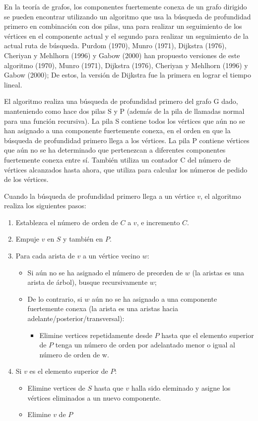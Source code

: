 En la teoría de grafos, los componentes fuertemente conexa de un grafo dirigido se pueden encontrar utilizando un algoritmo que usa la búsqueda de profundidad primero en combinación con dos pilas, una para realizar un seguimiento de los vértices en el componente actual y el segundo para realizar un seguimiento de la actual ruta de búsqueda. Purdom (1970), Munro (1971), Dijkstra (1976), Cheriyan y Mehlhorn (1996) y Gabow (2000) han propuesto versiones de este algoritmo (1970), Munro (1971), Dijkstra (1976), Cheriyan y Mehlhorn (1996) y Gabow (2000); De estos, la versión de Dijkstra fue la primera en lograr el tiempo lineal.

El algoritmo realiza una búsqueda de profundidad primero del grafo G dado, manteniendo como hace dos pilas S y P (además de la pila de llamadas normal para una función recursiva). La pila S contiene todos los vértices que aún no se han asignado a una componente fuertemente conexa, en el orden en que la búsqueda de profundidad primero llega a los vértices. La pila P contiene vértices que aún no se ha determinado que pertenezcan a diferentes componentes fuertemente conexa entre sí. También utiliza un contador C del número de vértices alcanzados hasta ahora, que utiliza para calcular los números de pedido de los vértices.

Cuando la búsqueda de profundidad primero llega a un vértice $v$, el algoritmo realiza los siguientes pasos:

\begin{enumerate}
	\item Establezca el número de orden de $C$ a $v$, e incremento $C$.
	\item Empuje $v$ en $S$ y también en $P$.
	\item Para cada arista de $v$ a un vértice vecino $w$:
	\begin{itemize}
		\item Si aún no se ha asignado el número de preorden de $w$ (la aristas es una arista de árbol), busque recursivamente $w$;
		\item De lo contrario, si $w$ aún no se ha asignado a una componente fuertemente conexa (la arista es una aristas hacia adelante/posterior/transversal):
		\begin{itemize}
			\item Elimine vertices repetidamente desde $P$ hasta que el elemento superior de $P$ tenga un número de orden por adelantado menor o igual al número de orden de w.
		\end{itemize}
	\end{itemize}
	\item Si $v$ es el elemento superior de $P$:
	\begin{itemize}
		\item Elimine vertices de $S$ hasta que $v$ halla sido eleminado y asigne los vértices eliminados a un nuevo componente.
		\item Elimine $v$ de $P$
	\end{itemize}
\end{enumerate}

